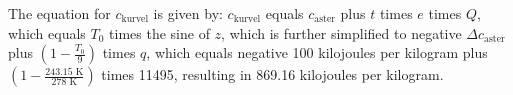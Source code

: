 The equation for \( c_{\text{kurvel}} \) is given by:
\( c_{\text{kurvel}} \) equals \( c_{\text{aster}} \) plus \( t \) times \( e \) times \( Q \),
which equals \( T_0 \) times the sine of \( z \),
which is further simplified to negative \( \Delta c_{\text{aster}} \) plus \( \left( 1 - \frac{T_0}{9} \right) \) times \( q \),
which equals negative 100 kilojoules per kilogram plus \( \left( 1 - \frac{243.15 \text{ K}}{278 \text{ K}} \right) \) times 11495,
resulting in 869.16 kilojoules per kilogram.